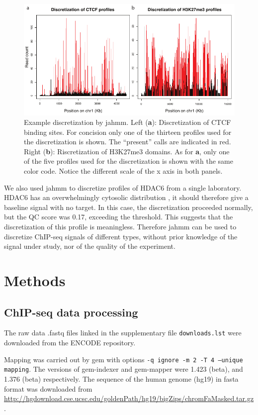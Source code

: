 \documentclass[12pt]{article}
\begin{document}
\begin{figure}
  \includegraphics[width=\textwidth]{Fig3.pdf}
  \caption{Example discretization by jahmm.
  Left (\textbf{a}): Discretization of CTCF binding sites. For concision
  only one of the thirteen profiles used for the discretization is shown.
  The ``present'' calls are indicated in red.
  Right (\textbf{b}): Riscretization of H3K27me3 domains.
  As for \textbf{a}, only one of the five profiles used for the discretization
  is shown with the same color code. Notice the different scale of the x axis
  in both panels.}
\end{figure}

We also used jahmm to discretize profiles of HDAC6 from a single laboratory. HDAC6 has an overwhelmingly cytosolic distribution \cite{pmid12024216}, it should therefore give a baseline signal with no target. In this case, the discretization proceeded normally, but the QC score was 0.17, exceeding the threshold. This suggests that the discretization of this profile is meaningless. Therefore jahmm can be used to discretize ChIP-seq signals of different types, without prior knowledge of the signal under study, nor of the quality of the experiment.

\section{Methods}
\subsection{ChIP-seq data processing}
The raw data .fastq files linked in the supplementary file \texttt{downloads.lst} were downloaded from the ENCODE repository.

Mapping was carried out by gem \cite{pmid23103880} with options \texttt{-q ignore -m 2 -T 4 --unique mapping}. The versions of gem-indexer and gem-mapper were 1.423 (beta), and 1.376 (beta) respectively. The
sequence of the human genome (hg19) in fasta format was downloaded from \url{http://hgdownload.cse.ucsc.edu/goldenPath/hg19/bigZips/chromFaMasked.tar.gz}.
\end{document}
